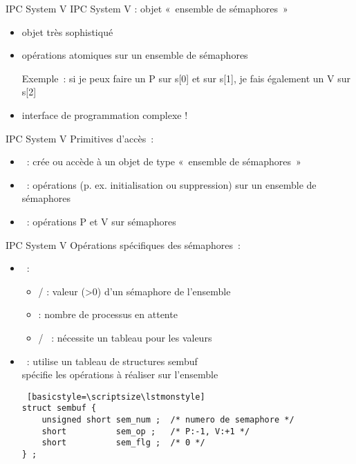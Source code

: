 
\begin {frame} {IPC System V}
    IPC System V : objet «~ensemble de sémaphores~»

    \vspace* {3mm}

    \begin {itemize}
	\item objet très sophistiqué
	\item opérations atomiques sur un ensemble de sémaphores

	    Exemple~: si je peux faire un P sur s[0] et sur s[1],
	    je fais également un V sur s[2]

	\item \implique interface de programmation complexe !
    \end {itemize}

\end {frame}

\begin {frame} {IPC System V}
    Primitives d'accès~:

    \begin {itemize}
	\item {}~: crée ou accède à un objet de type
	    «~ensemble de sémaphores~»
	\item {}~: opérations (p. ex. initialisation ou
	    suppression) sur un ensemble de sémaphores

	    \vspace* {3mm}

	\item {}~: opérations P et V sur sémaphores
    \end {itemize}

\end {frame}


\begin {frame} [fragile] {IPC System V}
    Opérations spécifiques des sémaphores~:
    \begin {itemize}
	\item {}~:
	    \begin {itemize}
		\item {} /  : valeur (>0) d'un
		    sémaphore de l'ensemble
		\item {} : nombre de processus en attente
		\item {} / ~: nécessite
		    un tableau pour les valeurs
	    \end {itemize}
	\item {}~: utilise un tableau de structures \code
	    {sembuf} \\
	    \implique spécifie les opérations à réaliser sur l'ensemble

\begin {lstlisting} [basicstyle=\scriptsize\lstmonstyle]
struct sembuf {
    unsigned short sem_num ;  /* numero de semaphore */
    short          sem_op ;   /* P:-1, V:+1 */
    short          sem_flg ;  /* 0 */
} ;
\end{lstlisting}

    \end {itemize}

\end{frame}

